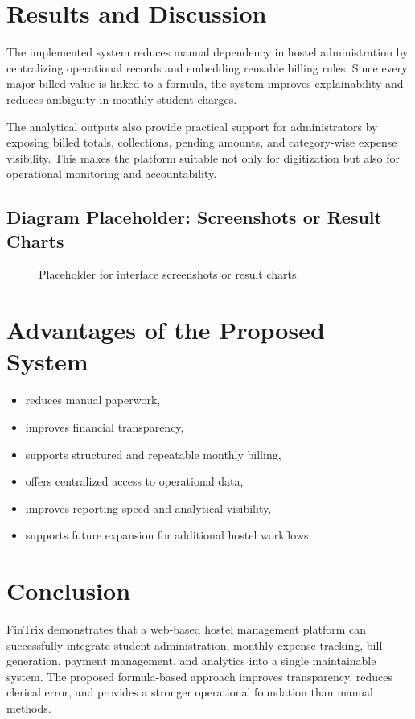 \documentclass[conference]{IEEEtran}
\begin{document}
\section{Results and Discussion}
The implemented system reduces manual dependency in hostel administration by centralizing operational records and embedding reusable billing rules. Since every major billed value is linked to a formula, the system improves explainability and reduces ambiguity in monthly student charges.

The analytical outputs also provide practical support for administrators by exposing billed totals, collections, pending amounts, and category-wise expense visibility. This makes the platform suitable not only for digitization but also for operational monitoring and accountability.

\subsection{Diagram Placeholder: Screenshots or Result Charts}
\begin{figure}[H]
\centering
{}
\caption{Placeholder for interface screenshots or result charts.}
\label{fig:results}
\end{figure}

\section{Advantages of the Proposed System}
\begin{itemize}
\item reduces manual paperwork,
\item improves financial transparency,
\item supports structured and repeatable monthly billing,
\item offers centralized access to operational data,
\item improves reporting speed and analytical visibility,
\item supports future expansion for additional hostel workflows.
\end{itemize}

\section{Conclusion}
FinTrix demonstrates that a web-based hostel management platform can successfully integrate student administration, monthly expense tracking, bill generation, payment management, and analytics into a single maintainable system. The proposed formula-based approach improves transparency, reduces clerical error, and provides a stronger operational foundation than manual methods.
\end{document}
